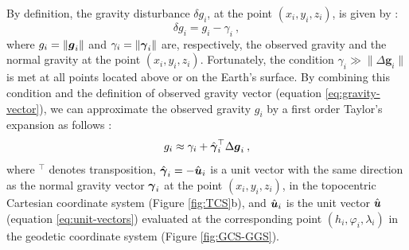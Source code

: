 \documentclass[extra]{gji}
\begin{document}
By definition, the gravity disturbance $\delta g_{i}$,
at the point $(x_{i}, y_{i}, z_{i})$, is given by 
\citep{heiskanen-moritz1967, hofmann-wellenhof-moritz2005}:
\begin{equation}
\delta g_{i} =  g_{i} - \gamma_{i} \: ,
\label{eq:gravity-disturbance}
\end{equation}
where $g_{i} = \| \mitbf{g}_{i} \|$ and 
$\gamma_{i} = \| \mitbf{\gamma}_{i} \|$ are,
respectively, the observed gravity and the normal gravity at the
point $(x_{i}, y_{i}, z_{i})$.
Fortunately, the condition 
$\gamma_{i} \gg \| \Delta \mathbf{g}_{i} \|$ 
is met at all points located above or on the Earth's surface.
By combining this condition and the definition of observed gravity vector
(equation \ref{eq:gravity-vector}), we can approximate the observed gravity
$g_{i}$ by a first order Taylor's expansion as follows 
\citep{sanso_sideris2013}:
\begin{equation}
g_{i} \approx \gamma_{i} + 
\hat{\mitbf{\gamma}}_{i}^{\top} \Delta \mitbf{g}_{i} \: ,
\label{eq:gobs-approx}
\end{equation}
where $^{\top}$ denotes transposition,
$\hat{\mitbf{\gamma}}_{i} = -\hat{\mitbf{u}}_{i}$ is a unit 
vector with the same direction as the normal gravity vector 
$\mitbf{\gamma}_{i}$ at the point $(x_{i}, y_{i}, z_{i})$, in the
topocentric Cartesian coordinate system (Figure \ref{fig:TCS}b), and
$\hat{\mitbf{u}}_{i}$ is the unit vector $\hat{\mitbf{u}}$ 
(equation \ref{eq:unit-vectors}) evaluated at the corresponding 
point $(h_{i}, \varphi_{i}, \lambda_{i})$ in the 
geodetic coordinate system (Figure \ref{fig:GCS-GGS}).
\end{document}
